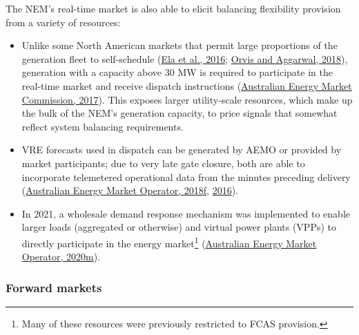 \documentclass[12pt,a4paper,]{report}
\providecommand{\tightlist}{%
  \setlength{\itemsep}{0pt}\setlength{\parskip}{0pt}}
\begin{document}
The NEM's real-time market is also able to elicit balancing flexibility
provision from a variety of resources:

\begin{itemize}
\tightlist
\item
  Unlike some North American markets that permit large proportions of
  the generation fleet to self-schedule
  (\protect\hyperlink{ref-elaWholesaleElectricityMarket2016}{Ela et al.,
  2016};
  \protect\hyperlink{ref-orvisRefiningCompetitiveElectricity2018}{Orvis
  and Aggarwal, 2018}), generation with a capacity above 30 MW is
  required to participate in the real-time market and receive dispatch
  instructions
  (\protect\hyperlink{ref-australianenergymarketcommissionNonscheduledGenerationLoad2017}{Australian
  Energy Market Commission, 2017}). This exposes larger utility-scale
  resources, which make up the bulk of the NEM's generation capacity, to
  price signals that somewhat reflect system balancing requirements.
\item
  VRE forecasts used in dispatch can be generated by AEMO or provided by
  market participants; due to very late gate closure, both are able to
  incorporate telemetered operational data from the minutes preceding
  delivery
  (\protect\hyperlink{ref-australianenergymarketoperatorSemiScheduledGenerationDispatch2018}{Australian
  Energy Market Operator, 2018f},
  \protect\hyperlink{ref-australianenergymarketoperatorSchedulingErrorReport2016}{2016}).
\item
  In 2021, a wholesale demand response mechanism was implemented to
  enable larger loads (aggregated or otherwise) and virtual power plants
  (VPPs) to directly participate in the energy market\footnote{Many of
    these resources were previously restricted to FCAS provision.}
  (\protect\hyperlink{ref-australianenergymarketoperatorWholesaleDemandReponse2020}{Australian
  Energy Market Operator, 2020m}).
\end{itemize}

\hypertarget{forward-markets}{%
\subsubsection{Forward markets}\label{forward-markets}}
\end{document}
